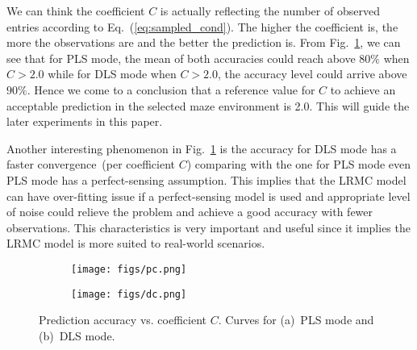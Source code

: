 We can think the coefficient $C$ is actually reflecting the number of observed entries according to Eq.~(\ref{eq:sampled_cond}). The higher the coefficient is, the more the observations are and the better the prediction is. From Fig.~\ref{fig:num_curves}, we can see that for PLS mode, the mean of both accuracies could reach above $80\%$ when $C> 2.0$ while for DLS mode when $C>2.0$, the accuracy level could arrive above $90\%$. Hence we come to a conclusion that a reference value for $C$ to achieve an acceptable prediction in the selected maze environment is 2.0. This will guide the later experiments in this paper.

Another interesting phenomenon in Fig.~\ref{fig:num_curves} is the accuracy for DLS mode has a faster convergence~(per coefficient $C$) comparing with the one for PLS mode even PLS mode has a perfect-sensing assumption. This implies that the LRMC model can have over-fitting issue if a perfect-sensing model is used and appropriate level of noise could relieve the problem and achieve a good accuracy with fewer observations. This characteristics is very important and useful since it implies the LRMC model is more suited to real-world scenarios. %

\begin{figure}%
  \centering
  \begin{subfigure}[b]{0.49\linewidth}
    \texttt{[image: figs/pc.png]}
    \caption{}
  \end{subfigure}
  \begin{subfigure}[b]{0.49\linewidth}
    \texttt{[image: figs/dc.png]}
    \caption{}
  \end{subfigure}
  \caption{Prediction accuracy vs. coefficient $C$. Curves for (a)~PLS mode and (b)~DLS mode.}
  \label{fig:num_curves}
\end{figure}